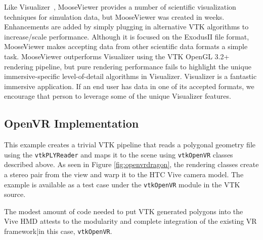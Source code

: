 Like Visualizer~\cite{Billen:2008}, MooseViewer provides a number of scientific visualization techniques for simulation data, but MooseViewer was created in weeks. Enhancements are added by simply plugging in alternative VTK algorithms to increase/scale performance.  Although it is focused on the ExodusII file format, MooseViewer makes accepting data from other scientific data formats a simple task. MooseViewer outperforms Visualizer using the VTK OpenGL 3.2+ rendering pipeline, but pure rendering performance fails to highlight the unique immersive-specific level-of-detail algorithms in Visualizer. Visualizer is a fantastic immersive application. If an end user has data in one of its accepted formats, we encourage that person to leverage some of the unique Visualizer features.


\subsection{OpenVR Implementation}

This example creates a trivial VTK pipeline that reads a polygonal geometry file
using the \texttt{vtkPLYReader} and maps it to the scene using \texttt{vtkOpenVR}
classes described above. As seen in Figure \ref{fig:openvrdragon}, the rendering
classes create a stereo pair from the view and warp it to the HTC Vive camera model. 
The example is available as a test case under the
\texttt{vtkOpenVR} module in the VTK source.

The modest amount of code needed to put VTK generated polygons into the
Vive HMD attests to the modularity and complete integration of the
existing VR framework|in this case, \texttt{vtkOpenVR}.
